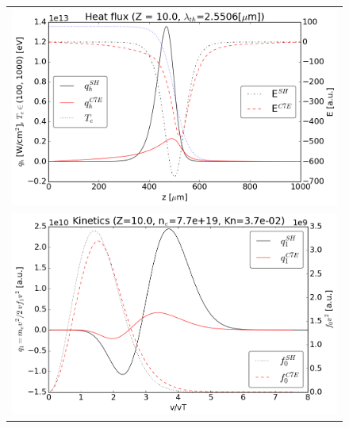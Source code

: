 \documentclass[preprint,12pt]{elsarticle}
\begin{document}
\begin{figure}[tbh]
  \begin{center}
    \begin{tabular}{c}
      \includegraphics[width=1.0\textwidth]{../results/fe_analysis/C7E/P5_heatflux_Z10_Kn27e-3.png} \\ 
      \includegraphics[width=1.0\textwidth]{../results/fe_analysis/C7E/P5_kinetics_Z10_Kn27e-3.png}
    \end{tabular}
  \caption{
  }
  \end{center}
  \label{fig:AWBScorrection_f1}
\end{figure}
\end{document}
